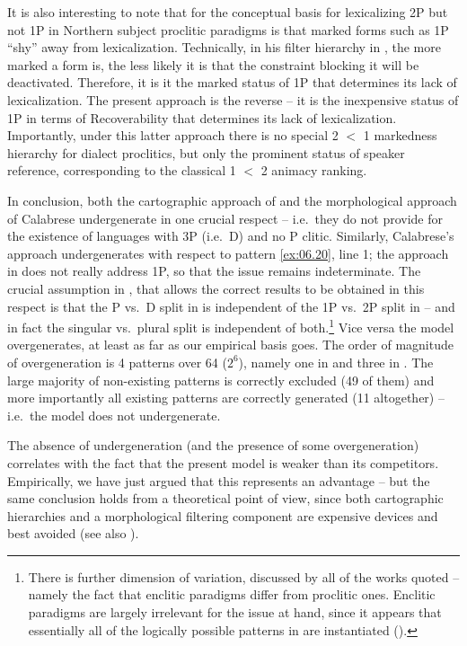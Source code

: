 \documentclass[output=paper]{langsci/langscibook}
\begin{document}
It is also interesting to note that for \citet{Calabrese2008} the conceptual
basis for lexicalizing 2P but not 1P in Northern  subject proclitic
paradigms is that marked forms such as 1P “shy” away from lexicalization.
Technically, in his filter hierarchy in , the more marked a form
is, the less likely it is that the constraint blocking it will be deactivated.
Therefore, it is it the marked status of 1P that determines its lack of
lexicalization. The present approach is the reverse – it is the inexpensive
status of 1P in terms of Recoverability that determines its lack of
lexicalization. Importantly, under this latter approach there is no special 2
$<$ 1 markedness hierarchy for  dialect proclitics, but only the
prominent status of speaker reference, corresponding to the classical 1 $<$ 2
animacy ranking.

In conclusion, both the cartographic approach of
\citet{CardinalettiRepetti2008} and the morphological approach of Calabrese
undergenerate in one crucial respect – i.e.\ they do not provide for the
existence of languages with 3P (i.e.\ D)  and no P clitic. Similarly,
Calabrese’s approach undergenerates with respect to pattern
\eqref{ex:06.20}, line 1; the approach in \citeauthor{CardinalettiRepetti2008} does not
really address 1P, so that the issue remains indeterminate. The crucial
assumption in \citet{ManziniSavoia2005}, \citet{Manzini2015b} that allows the
correct results to be obtained in this respect is that the P vs.\ D split in
 is independent of the 1P vs.\ 2P split in 
– and in fact the singular vs.\ plural split is independent of
both.\footnote{There is further dimension of variation, discussed by all of the
    works quoted – namely the fact that enclitic paradigms differ from
    proclitic ones. Enclitic paradigms are largely irrelevant for the issue at
    hand, since it appears that essentially all of the logically possible
patterns in  are instantiated
(\citealt{ManziniSavoia2005,Manzini2015b}). } Vice versa the model
overgenerates, at least as far as our empirical basis goes. The order of
magnitude of overgeneration is 4 patterns over 64 ($2^6$),
namely one in  and three in .
The large majority of non-existing patterns is correctly excluded (49 of them)
and more importantly all existing patterns are correctly generated (11
altogether) – i.e.\ the model does not undergenerate.

The absence of undergeneration (and the presence of some overgeneration)
correlates with the fact that the present model is weaker than its competitors.
Empirically, we have just argued that this represents an advantage – but the
same conclusion holds from a theoretical point of view, since both cartographic
hierarchies and a morphological filtering component are expensive devices and
best avoided (see also \citealt{ChoGalOtt2019}).
\end{document}

